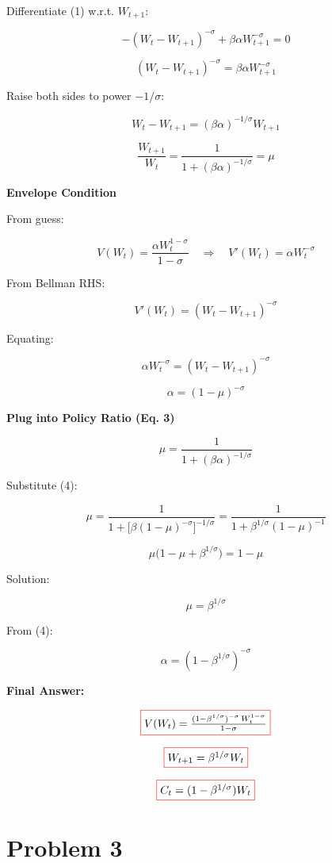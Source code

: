 \documentclass[12pt]{article}
\begin{document}
Differentiate (1) w.r.t. \( W_{t+1} \):

\[
-(W_t - W_{t+1})^{-\sigma} + \beta \alpha W_{t+1}^{-\sigma} = 0
\]

\[
(W_t - W_{t+1})^{-\sigma} = \beta \alpha W_{t+1}^{-\sigma} \tag{2}
\]

Raise both sides to power \(-1/\sigma\):

\[
W_t - W_{t+1} = (\beta \alpha)^{-1/\sigma} W_{t+1}
\]

\[
\frac{W_{t+1}}{W_t} = \frac{1}{1 + (\beta \alpha)^{-1/\sigma}} = \mu \tag{3}
\]


\textbf{Envelope Condition}

From guess:

\[
V(W_t) = \frac{\alpha W_t^{1-\sigma}}{1-\sigma} 
\quad \Rightarrow \quad
V'(W_t) = \alpha W_t^{-\sigma}
\]

From Bellman RHS:

\[
V'(W_t) = (W_t - W_{t+1})^{-\sigma}
\]

Equating:

\[
\alpha W_t^{-\sigma} = (W_t - W_{t+1})^{-\sigma}
\]

\[
\alpha = (1 - \mu)^{-\sigma} \tag{4}
\]


\textbf{Plug into Policy Ratio (Eq. 3)}

\[
\mu = \frac{1}{1 + (\beta \alpha)^{-1/\sigma}} \tag{3 revisited}
\]

Substitute (4):

\[
\mu = \frac{1}{1 + \big[ \beta (1-\mu)^{-\sigma} \big]^{-1/\sigma}}
= \frac{1}{1 + \beta^{1/\sigma}(1-\mu)^{-1}}
\]

\[
\mu \big(1 - \mu + \beta^{1/\sigma} \big) = 1 - \mu
\]

Solution:

\[
\mu = \beta^{1/\sigma} \tag{5}
\]

From (4):

\[
\alpha = (1 - \beta^{1/\sigma})^{-\sigma} \tag{6}
\]

\textbf{Final Answer:}

\[
\fcolorbox{red}{white}{\(
V(W_t) = \frac{(1 - \beta^{1/\sigma})^{-\sigma} \, W_t^{1-\sigma}}{1-\sigma}
\)}
\]

\[
\fcolorbox{red}{white}{\(
W_{t+1} = \beta^{1/\sigma} W_t
\)}
\]

\[
\fcolorbox{red}{white}{\(
C_t = (1 - \beta^{1/\sigma}) W_t
\)}
\]

\section*{\noindent\textbf{Problem 3}}
\end{document}

